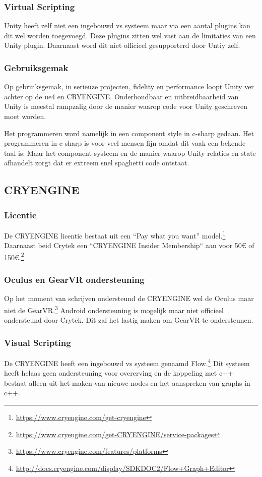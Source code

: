 \subsubsection{Virtual Scripting}
Unity heeft zelf niet een ingebouwd \gls{vs} systeem maar via een aantal plugins kan dit wel worden toegevoegd. Deze plugins zitten wel vast aan de limitaties van een Unity plugin. Daarnaast word dit niet officieel gesupporterd door Untiy zelf.

\subsubsection{Gebruiksgemak}
Op gebruiksgemak, in serieuze projecten, fidelity en performance loopt Unity ver achter op de \gls{ue4} en CRYENGINE. Onderhoudbaar en uitbreidbaarheid van Unity is meestal rampzalig door de manier waarop code voor Unity geschreven moet worden. 

Het programmeren word namelijk in een component style in c-sharp gedaan. Het programmeren in c-sharp is voor veel mensen fijn omdat dit vaak een bekende taal is. Maar het component systeem en de manier waarop Unity relaties en state afhandelt zorgt dat er extreem snel spaghetti code ontstaat. 

\subsection{CRYENGINE}
\subsubsection{Licentie}
De CRYENGINE licentie bestaat uit een “Pay what you want” model.\footnote{\url{https://www.cryengine.com/get-cryengine}} Daarnaast beid Crytek een “CRYENGINE Insider Membership“ aan voor 50€ of 150€.\footnote{\url{https://www.cryengine.com/get-CRYENGINE/service-packages}} 

\subsubsection{Oculus en GearVR ondersteuning}
Op het moment van schrijven ondersteund de CRYENGINE wel de Oculus maar niet de GearVR.\footnote{\url{https://www.cryengine.com/features/platforms}} Android ondersteuning is mogelijk maar niet officieel ondersteund door Crytek. Dit zal het lastig maken om GearVR te ondersteunen.

\subsubsection{Visual Scripting}
De CRYENGINE heeft een ingebouwd \gls{vs} systeem genaamd Flow.\footnote{\url{http://docs.cryengine.com/display/SDKDOC2/Flow+Graph+Editor}} Dit systeem heeft helaas geen ondersteuning voor overerving en de koppeling met c++ bestaat alleen uit het maken van nieuwe nodes en het aanspreken van graphs in c++.

